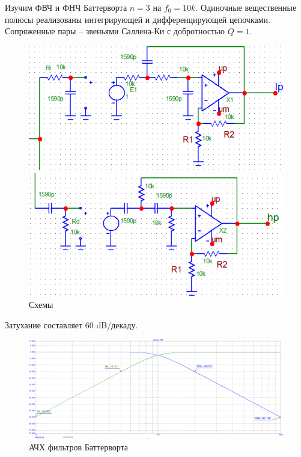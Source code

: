 \documentclass[12pt,a4paper]{article}
\begin{document}
	Изучим ФВЧ и ФНЧ Баттерворта $n = 3$ на $f_0 = 10k$.
	Одиночные вещественные полюсы реализованы интегрирующей и дифференцирующей цепочками.
	Сопряженные пары -- звеньями Саллена-Ки с добротностью $Q = 1$.
	\begin{figure}[H]
		\centering
		\begin{minipage}[b]{.5\textwidth}
			\includegraphics[width=1\linewidth]{res/sk3pole_scheme_lp.png}
		\end{minipage}%
		\begin{minipage}[b]{.5\textwidth}
			\includegraphics[width=1\linewidth]{res/sk3pole_scheme_hp.png}
		\end{minipage}
		\caption{Схемы}
	\end{figure}
	
	Затухание составляет $60$ dB/декаду.
	\begin{figure}[H]
		\centering
		\includegraphics[width=1.0\linewidth]{res/sk3pole_ach.png}
		\caption{АЧХ фильтров Баттерворта}
		\label{scheme}
	\end{figure}
	
\end{document}
